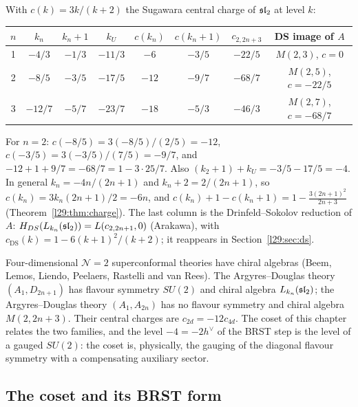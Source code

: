 \begin{example}[Level data for $n=1,2,3$]\label{l29:ex:levels}
With $c(k)=3k/(k+2)$ the Sugawara central charge of $\mathfrak{sl}_2$ at level $k$:
\begin{center}\small
\begin{tabular}{cccccccc}
\toprule
$n$ & $k_n$ & $k_n+1$ & $k_U$ & $c(k_n)$ & $c(k_n+1)$ & $c_{2,2n+3}$ & DS image of $A$\\
\midrule
1 & $-4/3$ & $-1/3$ & $-11/3$ & $-6$ & $-3/5$ & $-22/5$ & $M(2,3)$, $c=0$\\
2 & $-8/5$ & $-3/5$ & $-17/5$ & $-12$ & $-9/7$ & $-68/7$ & $M(2,5)$, $c=-22/5$\\
3 & $-12/7$ & $-5/7$ & $-23/7$ & $-18$ & $-5/3$ & $-46/3$ & $M(2,7)$, $c=-68/7$\\
\bottomrule
\end{tabular}
\end{center}
For $n=2$: $c(-8/5)=3(-8/5)/(2/5)=-12$, $c(-3/5)=3(-3/5)/(7/5)=-9/7$, and $-12+1+9/7=-68/7=1-3\cdot25/7$. Also
$(k_2+1)+k_U=-3/5-17/5=-4$. In general $k_n=-4n/(2n+1)$ and $k_n+2=2/(2n+1)$, so
$c(k_n)=3k_n(2n+1)/2=-6n$, and
$c(k_n)+1-c(k_n+1)=1-\frac{3(2n+1)^2}{2n+3}$ (Theorem~\ref{l29:thm:charge}). The last column is the
Drinfeld--Sokolov reduction of $A$: $H_{DS}(L_{k_n}(\mathfrak{sl}_2))=L(c_{2,2n+1},0)$ (Arakawa), with
$c_{\mathrm{DS}}(k)=1-6(k+1)^2/(k+2)$; it reappears in Section~\ref{l29:sec:ds}.
\end{example}

\begin{physics}
Four-dimensional $\mathcal N=2$ superconformal theories have chiral algebras (Beem, Lemos, Liendo, Peelaers, Rastelli
and van Rees). The Argyres--Douglas theory $(A_1,D_{2n+1})$ has flavour symmetry $SU(2)$ and chiral algebra
$L_{k_n}(\mathfrak{sl}_2)$; the Argyres--Douglas theory $(A_1,A_{2n})$ has no flavour symmetry and chiral algebra
$M(2,2n+3)$. Their central charges are $c_{2d}=-12c_{4d}$. The coset of this chapter relates the two families, and
the level $-4=-2h^\vee$ of the BRST step is the level of a gauged $SU(2)$: the coset is, physically, the gauging of
the diagonal flavour symmetry with a compensating auxiliary sector.
\end{physics}

\subsection{The coset and its BRST form}\label{l29:sec:coset}

